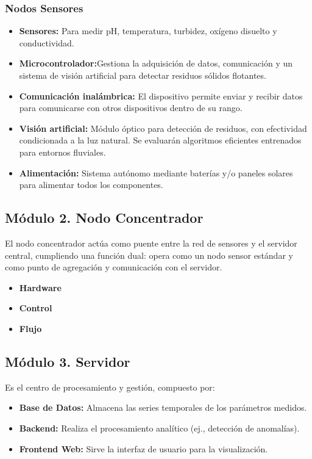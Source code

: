 \subsubsection*{Nodos Sensores}
\begin{itemize}  
  \item \textbf{Sensores:} Para medir pH, temperatura, turbidez, oxígeno disuelto y conductividad.
  \item \textbf{Microcontrolador:}Gestiona la adquisición de datos, comunicación y un sistema de visión artificial para detectar residuos sólidos flotantes.
  \item \textbf{Comunicación inalámbrica:} El dispositivo permite enviar y recibir datos para comunicarse con otros dispositivos dentro de su rango.
  \item \textbf{Visión artificial:} Módulo óptico para detección de residuos, con efectividad condicionada a la luz natural. Se evaluarán algoritmos eficientes entrenados para entornos fluviales.
  \item \textbf{Alimentación:} Sistema autónomo mediante baterías y/o paneles solares para alimentar todos los componentes.
\end{itemize}

\subsection{Módulo 2. Nodo Concentrador}
El nodo concentrador actúa como puente entre la red de sensores y el servidor central, cumpliendo una función dual: opera como un nodo sensor estándar y como punto de agregación y comunicación con el servidor.

\begin{itemize}
  \item \textbf{Hardware}
  \item \textbf{Control}
  \item \textbf{Flujo}
\end{itemize}

\subsection{Módulo 3. Servidor}
Es el centro de procesamiento y gestión, compuesto por:
\begin{itemize}
\item \textbf{Base de Datos:} Almacena las series temporales de los parámetros medidos.
\item \textbf{Backend:} Realiza el procesamiento analítico (ej., detección de anomalías).
\item \textbf{Frontend Web:} Sirve la interfaz de usuario para la visualización.
\end{itemize}

